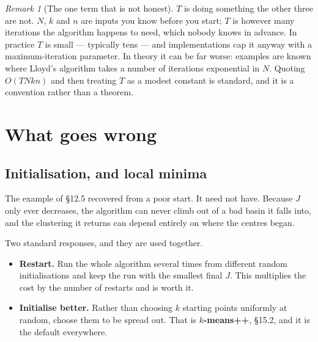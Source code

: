 \documentclass[11pt]{article}
\theoremstyle{plain}
\theoremstyle{definition}
\theoremstyle{remark}
\newtheorem*{rmk}{Remark}
\begin{document}
\begin{rmk}[The one term that is not honest]
$T$ is doing something the other three are not. $N$, $k$ and $n$ are inputs you
know before you start; $T$ is however many iterations the algorithm happens to
need, which nobody knows in advance. In practice $T$ is small --- typically tens
--- and implementations cap it anyway with a maximum-iteration parameter. In
theory it can be far worse: examples are known where Lloyd's algorithm takes a
number of iterations exponential in $N$. Quoting $O(TNkn)$ and then treating $T$
as a modest constant is standard, and it is a convention rather than a theorem.
\end{rmk}

\section{What goes wrong}
\subsection{Initialisation, and local minima}
The example of \S12.5 recovered from a poor start. It need not have. Because
$J$ only ever decreases, the algorithm can never climb out of a bad basin it
falls into, and the clustering it returns can depend entirely on where the
centres began.

Two standard responses, and they are used together.

\begin{itemize}[leftmargin=1.4em,itemsep=4pt]
  \item \textbf{Restart.} Run the whole algorithm several times from different
        random initialisations and keep the run with the smallest final $J$.
        This multiplies the cost by the number of restarts and is worth it.
  \item \textbf{Initialise better.} Rather than choosing $k$ starting points
        uniformly at random, choose them to be spread out. That is
        \textbf{$k$-means++}, \S15.2, and it is the default everywhere.
\end{itemize}

\end{document}
